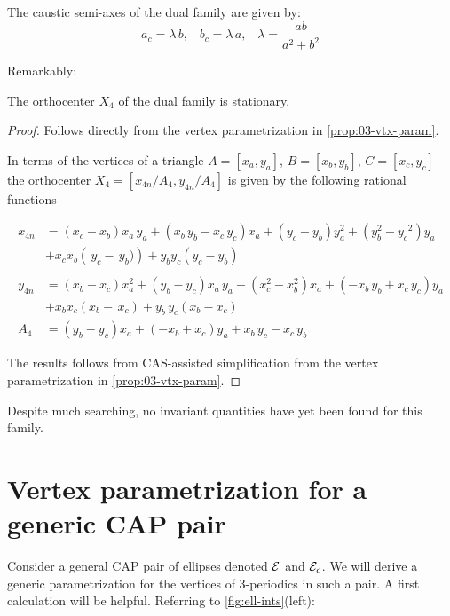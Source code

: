 \begin{proposition}
The caustic semi-axes of the dual family are given by:
\[ a_c=\lambda\,b,\;\;\;b_c=\lambda\,a,\;\;\;\lambda=\frac{a b}{a^2+b^2} \]
\label{prop:03-dual-cayley}
\end{proposition}

Remarkably:

\begin{proposition}
The orthocenter $X_4$ of the dual family is stationary.
\end{proposition}

\begin{proof}
Follows directly from the vertex parametrization in \cref{prop:03-vtx-param}.

In terms of the vertices of a triangle $A=[x_a,y_a]$, $B=[x_b,y_b]$, $C=[x_c,y_c]$ the orthocenter $X_4=[x_{4n}/A_4,y_{4n}/A_4]$ is given by the following rational functions 

\begin{align*}
    x_{4n}&=   \left(x_c-x_b\right) x_a\,y_a+ \left( 
 x_b\,y_b-x_c\,y_c \right) x_a+ \left( y_c-y_b \right) y_a^2+ \left( y_b^2-{y_c}^{2} \right) y_a\\
&+  x_cx_b\left( \,y_c- \,y_b)
 \right) +y_by_c( y_c-y_b) \\
 \\
 y_{4n}&=  \left(x_b-x_c\right) x_a^2+ \left( y_b-y_c \right) x_a\,y_a+ \left( x_c^2-x_b^2\right) x_a+ \left( -x_b\,y_b+x_c\,y_c \right) y_a\\
 &+x_b  x_c(x_b- \,x_c)+ y_b\,y_c(x_b-x_c) \\
A_4&= \left(y_b-y_c \right) x_a+ \left( -x_b+x_c\right) y_a+x_b\,y_c-x_c\,y_b
\end{align*}

The results follows from CAS-assisted simplification from the vertex parametrization in \cref{prop:03-vtx-param}.
\end{proof}

Despite much searching, no invariant quantities have yet been found for this family.

\section{Vertex parametrization for a generic CAP pair}
\label{sec:03-vtx-param}

Consider a general CAP pair of ellipses denoted $\mathcal{E}$ and $\mathcal{E}_c$. We will derive a generic parametrization for the vertices of 3-periodics in such a pair. A first calculation will be helpful. Referring to \cref{fig:ell-ints}(left):

